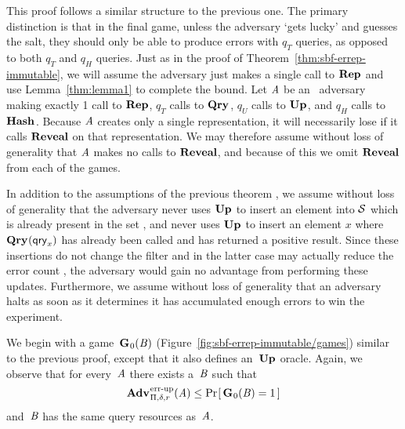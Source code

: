 This proof follows a similar structure to the previous one.
%
%
The primary distinction is that in the final game, unless the adversary `gets
lucky' and guesses the salt, they should only be able to produce errors with
$q_T$ queries, as opposed to both $q_T$ and $q_H$ queries.
%
Just as in the proof of Theorem~\ref{thm:sbf-errep-immutable}, we will assume
the adversary just makes a single call to $\textup{\textbf{Rep}}\hspace{0.5pt}$ and use Lemma~\ref{thm:lemma1}
to complete the bound. Let $\mathit{A}$ be an \erreps\ adversary making exactly 1
call to $\textup{\textbf{Rep}}\hspace{0.5pt}$, $q_T$ calls to $\textup{\textbf{Qry}}\hspace{0.5pt}$, $q_U$ calls to $\textup{\textbf{Up}}\hspace{0.5pt}$, and $q_H$ calls
to $\textup{\textbf{Hash}}\hspace{0.5pt}$. Because $\mathit{A}$ creates only a single representation, it will
necessarily lose if it calls $\mathbf{Reveal}$ on that representation. We may therefore
assume without loss of generality that $\mathit{A}$ makes no calls to $\mathbf{Reveal}$, and
because of this we omit $\mathbf{Reveal}$ from each of the games.
%

In addition to the assumptions of the previous theorem , we
assume without loss of generality that the adversary never uses $\textup{\textbf{Up}}\hspace{0.5pt}$ to insert
an element into $\mathcal{S}$ which is already present in the set , and never uses $\textup{\textbf{Up}}\hspace{0.5pt}$ to insert an
element $x$ where $\textup{\textbf{Qry}}\hspace{0.5pt}(\mathsf{qry}_x)$ has already been called and has returned a
positive result. Since these insertions do not change the filter and in the
latter case may actually reduce the error count ,
the adversary would gain no advantage from performing these updates.
Furthermore, we assume without loss of generality that an adversary halts as
soon as it determines it has accumulated enough errors to win the experiment.

We begin with a game~$\textup{\textbf{G}}\hspace{0.5pt}_0(\mathit{B})$
(Figure~\ref{fig:sbf-errep-immutable/games}) similar to the previous
proof, except that it also defines an~$\textup{\textbf{Up}}\hspace{0.5pt}$ oracle. Again, we
observe that for every~$\mathit{A}$ there exists a~$\mathit{B}$  such that
\begin{equation}
  \Adv{\errep}_{\Pi,\delta,r}(\advA) \leq \Prob{\game_0(\advB) = 1}
\end{equation}
and~$\mathit{B}$ has the same query resources as~$\mathit{A}$.

